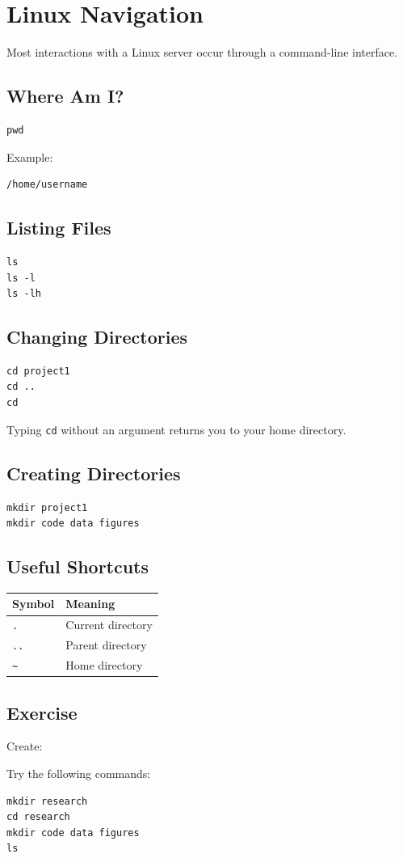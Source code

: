 \section{Linux Navigation}

Most interactions with a Linux server occur through a command-line interface.

\subsection{Where Am I?}

\begin{lstlisting}
pwd
\end{lstlisting}

Example:

\begin{lstlisting}
/home/username
\end{lstlisting}

\subsection{Listing Files}

\begin{lstlisting}
ls
ls -l
ls -lh
\end{lstlisting}

\subsection{Changing Directories}

\begin{lstlisting}
cd project1
cd ..
cd
\end{lstlisting}

Typing \texttt{cd} without an argument returns you to your home directory.

\subsection{Creating Directories}

\begin{lstlisting}
mkdir project1
mkdir code data figures
\end{lstlisting}

\subsection{Useful Shortcuts}

\begin{center}
\begin{tabular}{ll}
\toprule
Symbol & Meaning \\
\midrule
\texttt{.} & Current directory \\
\texttt{..} & Parent directory \\
\texttt{\~} & Home directory \\
\bottomrule
\end{tabular}
\end{center}

\subsection{Exercise}

Create:

Try the following commands: 
\begin{lstlisting} 
mkdir research 
cd research 
mkdir code data figures 
ls 
\end{lstlisting}
